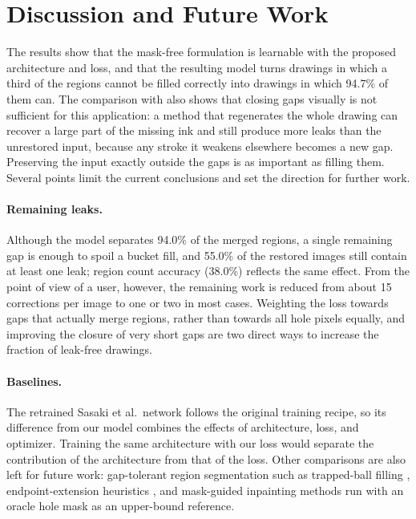 \documentclass[pdflatex,sn-mathphys-num]{sn-jnl}%
\begin{document}
\section{Discussion and Future Work}
\label{sec:discussion}

The results show that the mask-free formulation is learnable with the proposed
architecture and loss, and that the resulting model turns drawings in which a third
of the regions cannot be filled correctly into drawings in which 94.7\% of them can.
The comparison with \citet{sasaki2017joint} also shows that closing gaps visually is
not sufficient for this application: a method that regenerates the whole drawing can
recover a large part of the missing ink and still produce more leaks than the
unrestored input, because any stroke it weakens elsewhere becomes a new gap.
Preserving the input exactly outside the gaps is as important as filling them.
Several points limit the current conclusions and set the direction for further work.

\paragraph{Remaining leaks.} Although the model separates 94.0\% of the merged
regions, a single remaining gap is enough to spoil a bucket fill, and 55.0\% of the
restored images still contain at least one leak; region count accuracy (38.0\%)
reflects the same effect. From the point of view of a user, however, the remaining
work is reduced from about 15 corrections per image to one or two in most cases.
Weighting the loss towards gaps that actually merge regions, rather than towards all
hole pixels equally, and improving the closure of very short gaps are two direct ways
to increase the fraction of leak-free drawings.

\paragraph{Baselines.} The retrained Sasaki et al.\ network follows the
original training recipe, so its difference from our model combines the effects of
architecture, loss, and optimizer. Training the same architecture with our loss would
separate the contribution of the architecture from that of the loss.
Other comparisons are also left for future work: gap-tolerant region segmentation
such as trapped-ball filling \citep{zhang2009vectorizing}, endpoint-extension heuristics \citep{fourey2018flat}, and mask-guided inpainting methods run with an oracle hole mask as an
upper-bound reference.
\end{document}
